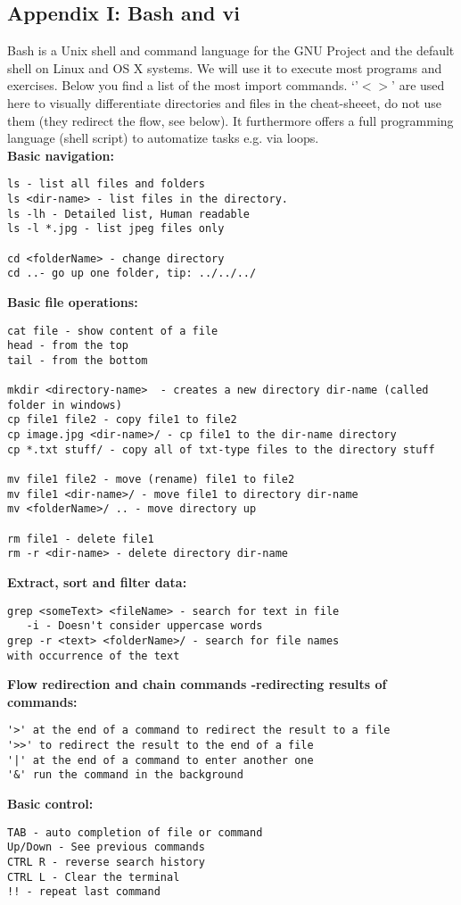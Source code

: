 \subsection{Appendix I: Bash and vi}\label{app:bash}
Bash is a Unix shell and command language for the GNU Project and the default shell on Linux and OS X systems. We will use it to execute most programs and exercises. Below you find a list of the most import commands.  `'$<>$' are used here to visually differentiate directories and files in the cheat-sheeet, do not use them (they redirect the flow, see below). It furthermore offers a full programming language (shell script) to automatize tasks e.g. via loops.\\

\textbf{Basic navigation:}
\begin{verbatim}
ls - list all files and folders
ls <dir-name> - list files in the directory.
ls -lh - Detailed list, Human readable
ls -l *.jpg - list jpeg files only

cd <folderName> - change directory
cd ..- go up one folder, tip: ../../../
\end{verbatim}
\textbf{Basic file operations:}
\begin{verbatim}
cat file - show content of a file
head - from the top
tail - from the bottom

mkdir <directory-name>  - creates a new directory dir-name (called folder in windows) 
cp file1 file2 - copy file1 to file2 
cp image.jpg <dir-name>/ - cp file1 to the dir-name directory 
cp *.txt stuff/ - copy all of txt-type files to the directory stuff

mv file1 file2 - move (rename) file1 to file2
mv file1 <dir-name>/ - move file1 to directory dir-name 
mv <folderName>/ .. - move directory up 

rm file1 - delete file1 
rm -r <dir-name> - delete directory dir-name
\end{verbatim}
\textbf{Extract, sort and filter data:}
\begin{verbatim}
grep <someText> <fileName> - search for text in file
   -i - Doesn't consider uppercase words
grep -r <text> <folderName>/ - search for file names
with occurrence of the text
\end{verbatim}
\textbf{Flow redirection and chain commands -redirecting results of commands:}
\begin{verbatim}
'>' at the end of a command to redirect the result to a file
'>>' to redirect the result to the end of a file
'|' at the end of a command to enter another one
'&' run the command in the background 
\end{verbatim}
\noindent \textbf{Basic control:}
\begin{verbatim}
TAB - auto completion of file or command
Up/Down - See previous commands
CTRL R - reverse search history
CTRL L - Clear the terminal
!! - repeat last command 
\end{verbatim}


